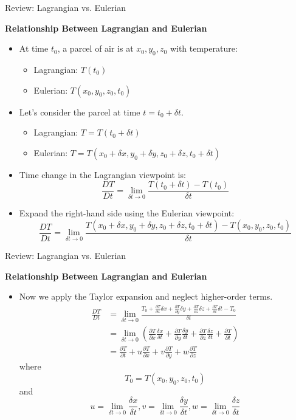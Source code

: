 \begin{frame}{Review: Lagrangian vs. Eulerian}

\textbf{Relationship Between Lagrangian and Eulerian}
\begin{itemize}
	\item At time $t_0$, a parcel of air is at $x_0, y_0, z_0$ with temperature:
	\begin{itemize}
		\item Lagrangian: $T(t_0)$
		\item Eulerian: $T(x_0, y_0, z_0,t_0)$
	\end{itemize}
	\item Let's consider the parcel at time $t=t_0+\delta t$.
	\begin{itemize}
	\item Lagrangian: $T=T(t_0+ \delta t)$
	\item Eulerian: $T=T(x_0+\delta x, y_0+\delta y, z_0+\delta z,t_0+ \delta t)$
	\end{itemize}
	\item Time change in the Lagrangian viewpoint is:
	$$\frac{DT}{Dt} = \lim_{\delta t\rightarrow 0} \frac{T(t_0 + \delta t) - T(t_0)}{\delta t}$$
	\item Expand the right-hand side using the Eulerian viewpoint:
	$$\frac{DT}{Dt} = \lim_{\delta t\rightarrow 0} \frac{T(x_0+\delta x, y_0+\delta y, z_0+\delta z,t_0+ \delta t) - T(x_0, y_0, z_0,t_0)}{\delta t}$$
\end{itemize}
\end{frame}
\begin{frame}{Review: Lagrangian vs. Eulerian}

\textbf{Relationship Between Lagrangian and Eulerian}
\begin{itemize}
	\item Now we apply the Taylor expansion and neglect higher-order terms.
	\begin{align*}
		\frac{DT}{Dt} &= \lim_{\delta t\rightarrow 0}\frac{T_0 + \frac{\partial T}{\partial x}\delta x + \frac{\partial T}{\partial y}\delta y + \frac{\partial T}{\partial z}\delta z + \frac{\partial T}{\partial t}\delta t - T_0}{\delta t}\\
		&= \lim_{\delta t\rightarrow 0} \left(\frac{\partial T}{\partial x}\frac{\delta x}{\delta t} + \frac{\partial T}{\partial y}\frac{\delta y}{\delta t} + \frac{\partial T}{\partial z}\frac{\delta z}{\delta t} + \frac{\partial T}{\partial t} \right)\\
		&= \frac{\partial T}{\partial t} + u\frac{\partial T}{\partial x} + v\frac{\partial T}{\partial y} + w\frac{\partial T}{\partial z}
	\end{align*}
	where $$T_0 = T(x_0, y_0, z_0,t_0)$$ and $$u=\lim_{\delta t\rightarrow 0} \frac{\delta x}{\delta t}, v=\lim_{\delta t\rightarrow 0} \frac{\delta y}{\delta t}, w=\lim_{\delta t\rightarrow 0} \frac{\delta z}{\delta t}$$
\end{itemize}
\end{frame}

